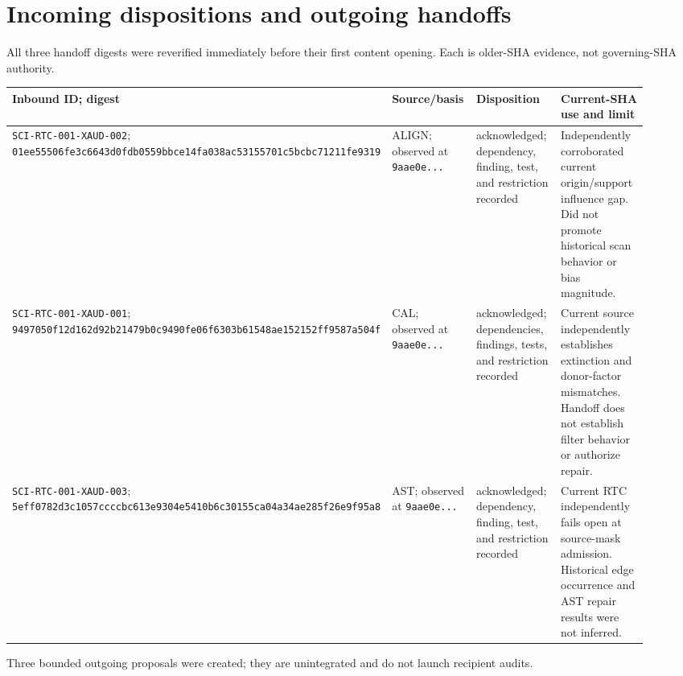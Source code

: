 \documentclass[11pt]{article}
\newcommand{\code}[1]{\nolinkurl{#1}}
\begin{document}
\section{Incoming dispositions and outgoing handoffs}

All three handoff digests were reverified immediately before their first
content opening.  Each is older-SHA evidence, not governing-SHA authority.

\begin{longtable}{@{}L{0.19\linewidth}L{0.18\linewidth}L{0.24\linewidth}L{0.31\linewidth}@{}}
\toprule
Inbound ID; digest & Source/basis & Disposition & Current-SHA use and limit \\
\midrule
\endhead
\code{SCI-RTC-001-XAUD-002}; \code{01ee55506fe3c6643d0fdb0559bbce14fa038ac53155701c5bcbc71211fe9319} & ALIGN; observed at \code{9aae0e...} & acknowledged; dependency, finding, test, and restriction recorded & Independently corroborated current origin/support influence gap.  Did not promote historical scan behavior or bias magnitude. \\
\code{SCI-RTC-001-XAUD-001}; \code{9497050f12d162d92b21479b0c9490fe06f6303b61548ae152152ff9587a504f} & CAL; observed at \code{9aae0e...} & acknowledged; dependencies, findings, tests, and restriction recorded & Current source independently establishes extinction and donor-factor mismatches.  Handoff does not establish filter behavior or authorize repair. \\
\code{SCI-RTC-001-XAUD-003}; \code{5eff0782d3c1057ccccbc613e9304e5410b6c30155ca04a34ae285f26e9f95a8} & AST; observed at \code{9aae0e...} & acknowledged; dependency, finding, test, and restriction recorded & Current RTC independently fails open at source-mask admission.  Historical edge occurrence and AST repair results were not inferred. \\
\bottomrule
\end{longtable}

Three bounded outgoing proposals were created; they are unintegrated and do
not launch recipient audits.
\end{document}
